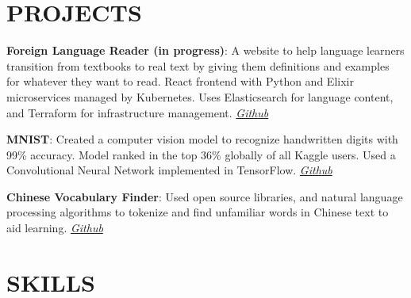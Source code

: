 \documentclass[margin]{res}
\begin{document}
\begin{resume}
\section{PROJECTS}

\par
\textbf{Foreign Language Reader (in progress)}:
A website to help language learners transition from textbooks to real text by giving them definitions and examples for whatever they want to read. React frontend with Python and Elixir microservices managed by Kubernetes. Uses Elasticsearch for language content, and Terraform for infrastructure management. \textit{\href{https://github.com/lucaskjaero/foreign-language-reader}{Github}}

\par
\textbf{MNIST}:
Created a computer vision model to recognize handwritten digits with 99\% accuracy. Model ranked in the top 36\% globally of all Kaggle users. Used a Convolutional Neural Network implemented in TensorFlow. \textit{\href{https://github.com/lucaskjaero/MNIST}{Github}}

\par
\textbf{Chinese Vocabulary Finder}:
Used open source libraries, and natural language processing algorithms to tokenize and find unfamiliar words in Chinese text to aid learning. \textit{\href{https://github.com/lucaskjaero/Chinese-Vocabulary-Finder}{Github}}



\section{SKILLS}


\end{resume}
\end{document}
